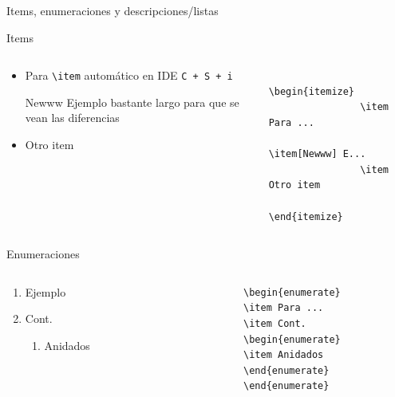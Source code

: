 \documentclass[12pt]{beamer}
\begin{document}
\begin{frame}{Items, enumeraciones y descripciones/listas}

\begin{block}{Items}
	\begin{columns}
		\begin{column}{0.5\textwidth}
			\begin{itemize}
				\item Para \verb|\item| automático en IDE \texttt{C + S + i}
				\item[Newww] Ejemplo bastante largo para que se vean las diferencias
				\item Otro item
			\end{itemize}
		\end{column}
		\begin{column}{0.35\linewidth}
			\begin{verbatim}
				\begin{itemize}
				\item Para ...
				\item[Newww] E...
				\item Otro item
				\end{itemize}
			\end{verbatim}
		\end{column}
	\end{columns}
\end{block}

\begin{block}{Enumeraciones}
	\begin{columns}
		\begin{column}{0.35\textwidth}
			\begin{enumerate}
				\item Ejemplo
				\item Cont.
				\begin{enumerate}
					\item Anidados
				\end{enumerate}
			\end{enumerate}
		\end{column}
		\begin{column}{0.4\linewidth}
			\begin{verbatim}
			\begin{enumerate}
			\item Para ...
			\item Cont.
			\begin{enumerate}
			\item Anidados
			\end{enumerate}
			\end{enumerate}
			\end{verbatim}
		\end{column}
	\end{columns}
\end{block}


\end{frame}
\end{document}
